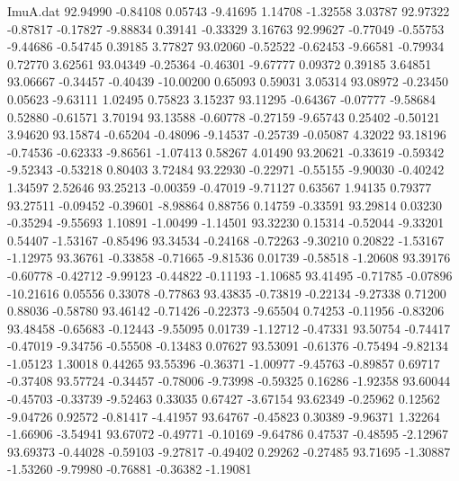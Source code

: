 \begin{filecontents}{ImuA.dat}
  92.94990   -0.84108    0.05743   -9.41695    1.14708   -1.32558    3.03787
  92.97322   -0.87817   -0.17827   -9.88834    0.39141   -0.33329    3.16763
  92.99627   -0.77049   -0.55753   -9.44686   -0.54745    0.39185    3.77827
  93.02060   -0.52522   -0.62453   -9.66581   -0.79934    0.72770    3.62561
  93.04349   -0.25364   -0.46301   -9.67777    0.09372    0.39185    3.64851
  93.06667   -0.34457   -0.40439  -10.00200    0.65093    0.59031    3.05314
  93.08972   -0.23450    0.05623   -9.63111    1.02495    0.75823    3.15237
  93.11295   -0.64367   -0.07777   -9.58684    0.52880   -0.61571    3.70194
  93.13588   -0.60778   -0.27159   -9.65743    0.25402   -0.50121    3.94620
  93.15874   -0.65204   -0.48096   -9.14537   -0.25739   -0.05087    4.32022
  93.18196   -0.74536   -0.62333   -9.86561   -1.07413    0.58267    4.01490
  93.20621   -0.33619   -0.59342   -9.52343   -0.53218    0.80403    3.72484
  93.22930   -0.22971   -0.55155   -9.90030   -0.40242    1.34597    2.52646
  93.25213   -0.00359   -0.47019   -9.71127    0.63567    1.94135    0.79377
  93.27511   -0.09452   -0.39601   -8.98864    0.88756    0.14759   -0.33591
  93.29814    0.03230   -0.35294   -9.55693    1.10891   -1.00499   -1.14501
  93.32230    0.15314   -0.52044   -9.33201    0.54407   -1.53167   -0.85496
  93.34534   -0.24168   -0.72263   -9.30210    0.20822   -1.53167   -1.12975
  93.36761   -0.33858   -0.71665   -9.81536    0.01739   -0.58518   -1.20608
  93.39176   -0.60778   -0.42712   -9.99123   -0.44822   -0.11193   -1.10685
  93.41495   -0.71785   -0.07896  -10.21616    0.05556    0.33078   -0.77863
  93.43835   -0.73819   -0.22134   -9.27338    0.71200    0.88036   -0.58780
  93.46142   -0.71426   -0.22373   -9.65504    0.74253   -0.11956   -0.83206
  93.48458   -0.65683   -0.12443   -9.55095    0.01739   -1.12712   -0.47331
  93.50754   -0.74417   -0.47019   -9.34756   -0.55508   -0.13483    0.07627
  93.53091   -0.61376   -0.75494   -9.82134   -1.05123    1.30018    0.44265
  93.55396   -0.36371   -1.00977   -9.45763   -0.89857    0.69717   -0.37408
  93.57724   -0.34457   -0.78006   -9.73998   -0.59325    0.16286   -1.92358
  93.60044   -0.45703   -0.33739   -9.52463    0.33035    0.67427   -3.67154
  93.62349   -0.25962    0.12562   -9.04726    0.92572   -0.81417   -4.41957
  93.64767   -0.45823    0.30389   -9.96371    1.32264   -1.66906   -3.54941
  93.67072   -0.49771   -0.10169   -9.64786    0.47537   -0.48595   -2.12967
  93.69373   -0.44028   -0.59103   -9.27817   -0.49402    0.29262   -0.27485
  93.71695   -1.30887   -1.53260   -9.79980   -0.76881   -0.36382   -1.19081

\end{filecontents}
